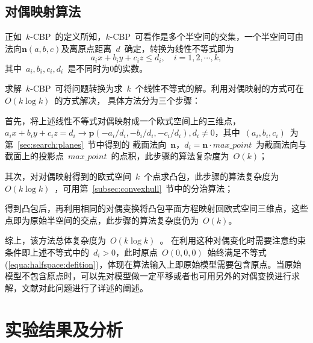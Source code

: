 \subsection{对偶映射算法}
\label{subsec:intersection-dual-mapping}

正如~$k$-CBP~的定义所知，$k$-CBP~可看作是多个半空间的交集，一个半空间可由法向$\bm{n}(a,b,c)$及离原点距离~$d$~确定，转换为线性不等式即为
\begin{equation}
  \label{equa:halfspace:defition}
  a_ix+b_iy+c_iz \leq d_i, \quad i=1,2,\cdots,k,
\end{equation}
其中~$a_i,b_i,c_i,d_i$~是不同时为0的实数。

求解~$k$-CBP~可将问题转换为求~$k$~个线性不等式的解。利用对偶映射的方式可在~$O(k \log k)$~的方式解决，
具体方法分为三个步骤\cite{Preparata1985Introduction}：
\\ \indent
\begin{inparaenum}[(1)]
\item   
首先，将上述线性不等式对偶映射成一个欧式空间上的三维点，
$a_ix+b_iy+c_iz=d_i \rightarrow \bm{p}(-a_i/d_i, -b_i/d_i,-c_i/d_i),d_i \neq 0$，其中~$(a_i,b_i,c_i)$~为第~\ref{sec:search:planes}~节中得到的
截面法向~$\bm{n}$，$d_i=\bm{n} \cdot
max\_point$~为截面法向与截面上的投影点~$max\_point$~的点积，此步骤的算法复杂度为~$O(k)$； \\ \indent
\item
其次，对对偶映射得到的欧式空间~$k$~个点求凸包，此步骤的算法复杂度为~$O(k\log k)$~，可用第~\ref{subsec:convexhull}~节中的分治算法； \\ \indent
\item
  得到凸包后，再利用相同的对偶变换将凸包平面方程映射回欧式空间三维点，这些点即为原始半空间的交点，此步骤的算法复杂度仍为~$O(k)$。
\end{inparaenum}

综上，该方法总体复杂度为~$O(k\log k)$~。
在利用这种对偶变化时需要注意约束条件即上述不等式中的~$d_i>0$，此时原点~$O(0,0,0)$~始终满足不等式(\ref{equa:halfspace:defition})，体现在算法输入上即原始模型需要包含原点。当原始模型不包含原点时，可以先对模型做一定平移或者也可用另外的对偶变换进行求解，文献对此问题进行了详述的阐述。

\section{实验结果及分析}
\label{sec:exper-kcbp}

